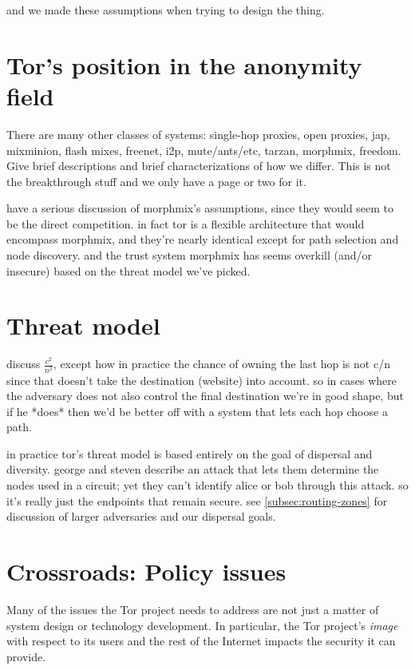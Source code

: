 \documentclass{llncs}
\begin{document}
and we made these assumptions when trying to design the thing.

\section{Tor's position in the anonymity field}
\label{sec:related}

There are many other classes of systems: single-hop proxies, open proxies,
jap, mixminion, flash mixes, freenet, i2p, mute/ants/etc, tarzan,
morphmix, freedom. Give brief descriptions and brief characterizations
of how we differ. This is not the breakthrough stuff and we only have
a page or two for it.

have a serious discussion of morphmix's assumptions, since they would
seem to be the direct competition. in fact tor is a flexible architecture
that would encompass morphmix, and they're nearly identical except for
path selection and node discovery. and the trust system morphmix has
seems overkill (and/or insecure) based on the threat model we've picked.

\section{Threat model}

discuss $\frac{c^2}{n^2}$, except how in practice the chance of owning
the last hop is not c/n since that doesn't take the destination (website)
into account. so in cases where the adversary does not also control the
final destination we're in good shape, but if he *does* then we'd be better
off with a system that lets each hop choose a path.

in practice tor's threat model is based entirely on the goal of dispersal
and diversity. george and steven describe an attack \cite{draft} that
lets them determine the nodes used in a circuit; yet they can't identify
alice or bob through this attack. so it's really just the endpoints that
remain secure. see \ref{subsec:routing-zones} for discussion of larger
adversaries and our dispersal goals.

\section{Crossroads: Policy issues}
\label{sec:crossroads-policy}

Many of the issues the Tor project needs to address are not just a
matter of system design or technology development. In particular, the
Tor project's \emph{image} with respect to its users and the rest of
the Internet impacts the security it can provide.
\end{document}
